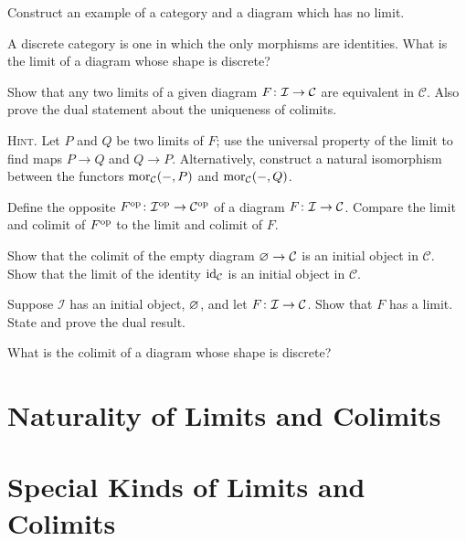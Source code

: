 \bx
\ben[label=(\alph*)]
\item Construct an example of a category and a diagram which has no limit.
\item A discrete category is one in which the only morphisms are identities. What is the limit of a diagram whose shape is discrete?
\een
\ex

\bs
\ben[label=(\alph*)]
\item  
\item 
\een
\es

\bp
Show that any two limits of a given diagram $F \colon \mathcal{I} \to \mathcal{C}$ are equivalent in $\mathcal{C}$. Also prove the dual statement about the uniqueness of colimits.

{\scshape Hint.} Let $P$ and $Q$ be two limits of $F$; use the universal property of the limit to find maps $P \to Q$ and $Q \to P$. Alternatively, construct a natural isomorphism between the functors $\operatorname{mor}_{\mathcal{C}}( - , P)$ and $\operatorname{mor}_{\mathcal{C}}( -,Q)$.
\ep

\bs
\es

\bx
Define the opposite $F^{\mathrm{op}} \colon \mathcal{I}^{\mathrm{op}} \to \mathcal{C}^{\mathrm{op}}$ of a diagram $F \colon\mathcal{I} \to\mathcal{C}$. Compare the limit and colimit of $F^{\mathrm{op}}$ to the limit and colimit of $F$.
\ex

\bs
\es

\bx
Show that the colimit of the empty diagram $\varnothing \to \mathcal{C}$ is an initial object in $\mathcal{C}$. Show that the limit of the identity $\mathrm{id}_\mathcal{C}$ is an initial object in $\mathcal{C}$.
\ex

\bs
\es

\bx
Suppose $\mathcal{I}$ has an initial object, $\varnothing$, and let $F \colon \mathcal{I} \to \mathcal{C}$. Show that $F$ has a limit. State and prove the dual result.
\ex

\bs
\es

\bx
What is the colimit of a diagram whose shape is discrete?
\ex

\bs
\es



\section{Naturality of Limits and Colimits}

\section{Special Kinds of Limits and Colimits}

